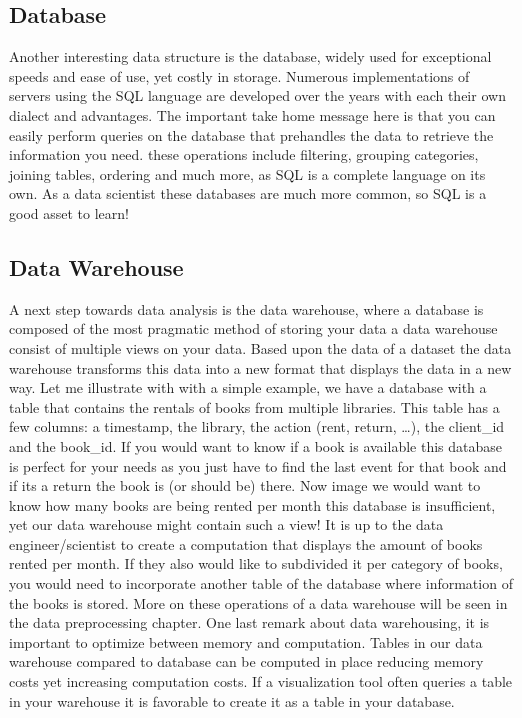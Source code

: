 \documentclass[letterpaper,10pt,english]{jupyterBook}
\begin{document}
\subsection{Database}
\label{\detokenize{c1_introduction/introduction:database}}
\sphinxAtStartPar
Another interesting data structure is the database, widely used for exceptional speeds and ease of use, yet costly in storage.
Numerous implementations of servers using the SQL language are developed over the years with each their own dialect and advantages.
The important take home message here is that you can easily perform queries on the database that pre\sphinxhyphen{}handles the data to retrieve the information you need.
these operations include filtering, grouping categories, joining tables, ordering and much more, as SQL is a complete language on its own.
As a data scientist these databases are much more common, so SQL is a good asset to learn!


\subsection{Data Warehouse}
\label{\detokenize{c1_introduction/introduction:data-warehouse}}
\sphinxAtStartPar
A next step towards data analysis is the data warehouse, where a database is composed of the most pragmatic method of storing your data a data warehouse consist of multiple views on your data.
Based upon the data of a dataset the data warehouse transforms this data into a new format that displays the data in a new way.
Let me illustrate with with a simple example, we have a database with a table that contains the rentals of books from multiple libraries.
This table has a few columns: a timestamp, the library, the action (rent, return, …), the client\_id and the book\_id.
If you would want to know if a book is available this database is perfect for your needs as you just have to find the last event for that book and if its a return the book is (or should be) there.
Now image we would want to know how many books are being rented per month this database is insufficient, yet our data warehouse might contain such a view!
It is up to the data engineer/scientist to create a computation that displays the amount of books rented per month.
If they also would like to subdivided it per category of books, you would need to incorporate another table of the database where information of the books is stored.
More on these operations of a data warehouse will be seen in the data preprocessing chapter.
One last remark about data warehousing, it is important to optimize between memory and computation.
Tables in our data warehouse compared to database can be computed in place reducing memory costs yet increasing computation costs.
If a visualization tool often queries a table in your warehouse it is favorable to create it as a table in your database.
\end{document}
